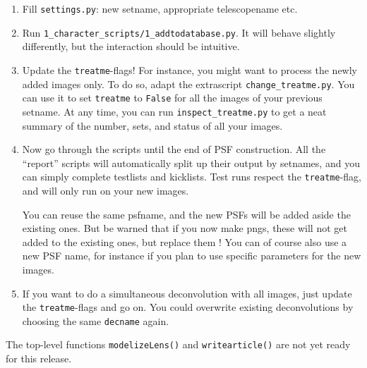 \begin{enumerate}
\item Fill \verb+settings.py+: new setname, appropriate telescopename etc. 

\item Run \verb+1_character_scripts/1_addtodatabase.py+. It will behave slightly differently, but the interaction should be intuitive.

\item Update the \verb+treatme+-flags! For instance, you might want to process the newly added images only. To do so, adapt the extrascript \verb+change_treatme.py+. You can use it to set \verb+treatme+ to \verb+False+ for all the images of your previous setname. At any time, you can run \verb+inspect_treatme.py+ to get a neat summary of the number, sets, and status of all your images.

\item Now go through the scripts until the end of PSF construction. All the ``report'' scripts will automatically split up their output by setnames, and you can simply complete testlists and kicklists. Test runs respect the \verb+treatme+-flag, and will only run on your new images.

You can reuse the same psfname, and the new PSFs will be added aside the existing ones. But be warned that if you now make pngs, these will not get added to the existing ones, but replace them ! You can of course also use a new PSF name, for instance if you plan to use specific parameters for the new images.

\item If you want to do a simultaneous deconvolution with all images, just update the \verb+treatme+-flags and go on. You could overwrite existing deconvolutions by choosing the same \verb+decname+ again.


\end{enumerate}

The top-level functions \verb+modelizeLens()+ and \verb+writearticle()+ are not yet ready for this release. \smiley

